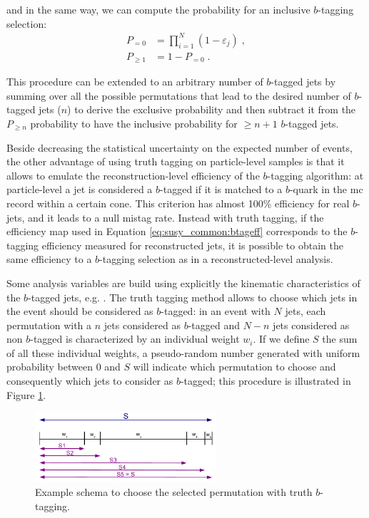 \noindent and in the same way, we can compute the probability for an inclusive $b$-tagging selection:
\begin{equation}
 \begin{split}
        P_{=0} &= \prod\limits_{i=1}^N \left( 1 - \varepsilon_{j} \right) \; ,\\
        P_{\geq 1} &= 1 - P_{=0} \; .
 \end{split}
\end{equation} 
 
\noindent This procedure can be extended to an arbitrary number of $b$-tagged jets by summing over all the possible permutations that lead to the desired number of $b$-tagged jets ($n$) to derive the exclusive probability and then subtract it from the $P_{\geq n}$ probability to have the inclusive probability for $\geq n+1$ $b$-tagged jets.
 
Beside decreasing the statistical uncertainty on the expected number of events, the other advantage of using truth tagging on particle-level samples is that it allows to emulate the reconstruction-level efficiency of the $b$-tagging algorithm: 
at particle-level a jet is considered a $b$-tagged if it is matched to a $b$-quark in the \gls{mc} record within a certain cone. This criterion has 
almost 100\% efficiency for real $b$-jets, and it leads to a null mistag rate. Instead with truth tagging, if the efficiency map used in Equation \ref{eq:susy_common:btageff} corresponds to the $b$-tagging efficiency measured for reconstructed jets, 
it is possible to obtain the same efficiency to a $b$-tagging selection as in a reconstructed-level analysis. 

Some analysis variables are build using explicitly the kinematic characteristics of the $b$-tagged jets, e.g. \mtb. The truth tagging method allows to choose which jets in the event should be considered as $b$-tagged: in an event with $N$ jets, each permutation with a $n$ jets considered as $b$-tagged and $N-n$ jets considered as non $b$-tagged is characterized by an individual weight $w_i$. If we define $S$ the sum of all these individual weights, a pseudo-random number generated with uniform probability between 0 and $S$ will indicate which permutation to choose and consequently which jets to consider as $b$-tagged; this procedure is illustrated in Figure \ref{fig:susy_common_trf_perm}. 

\begin{figure}[h]
\centering 
\includegraphics[width=0.6\textwidth]{figures/susy_common/trf_perm}
\caption{Example schema to choose the selected permutation with truth $b$-tagging.}\label{fig:susy_common_trf_perm}
\end{figure}


